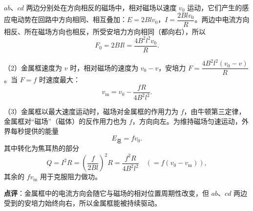 \begin{liti}
\begin{jiexi}[7cm]
$ab$、$cd$ 两边分别处在方向相反的磁场中，相对磁场以速度 $v_0$ 运动，它们产生的感应电动势在回路中方向相同、相互叠加：$E=2Blv_0$，$I=\dfrac{2Blv_0}{R}$。两边中电流方向相反、所在磁场方向也相反，所受安培力方向相同（都向右），所以
\[F_0=2BIl=\frac{4B^2l^2v_0}{R}.\]

（2）金属框速度为 $v$ 时，相对磁场的速度为 $v_0-v$，安培力 $F=\dfrac{4B^2l^2(v_0-v)}{R}$。当 $F=f$ 时速度最大：
\[v_{\mathrm m}=v_0-\frac{fR}{4B^2l^2}.\]

（3）金属框以最大速度运动时，磁场对金属框的作用力为 $f$，由牛顿第三定律，金属框对“磁场”（磁体）的反作用力也为 $f$，方向向左。为维持磁场匀速运动，外界每秒提供的能量
\[E_{\text{总}}=fv_0 .\]
其中转化为焦耳热的部分
\[Q=I^2R=\left(\frac{f}{2Bl}\right)^2R=\frac{f^2R}{4B^2l^2}\quad\left(=f(v_0-v_{\mathrm m})\right),\]
其余的 $fv_{\mathrm m}$ 用于克服阻力做功。

\textbf{点评}：金属框中的电流方向会随它与磁场的相对位置周期性改变，但 $ab$、$cd$ 两边受到的安培力始终向右，所以金属框能被持续驱动。
\end{jiexi}
\end{liti}
